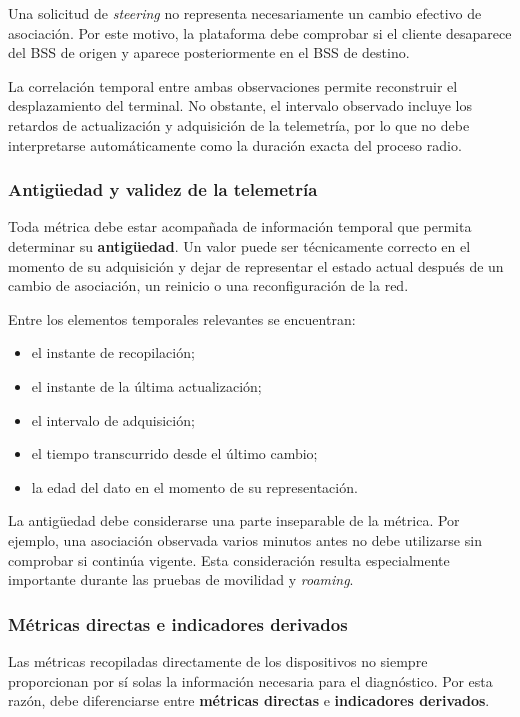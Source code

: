 Una solicitud de \textit{steering} no representa necesariamente un
cambio efectivo de asociación. Por este motivo, la plataforma debe
comprobar si el cliente desaparece del BSS de origen y aparece
posteriormente en el BSS de destino.

La correlación temporal entre ambas observaciones permite reconstruir el
desplazamiento del terminal. No obstante, el intervalo observado incluye
los retardos de actualización y adquisición de la telemetría, por lo que
no debe interpretarse automáticamente como la duración exacta del proceso
radio.

\subsubsection*{Antigüedad y validez de la telemetría}

Toda métrica debe estar acompañada de información temporal que permita
determinar su \textbf{antigüedad}. Un valor puede ser técnicamente
correcto en el momento de su adquisición y dejar de representar el estado
actual después de un cambio de asociación, un reinicio o una
reconfiguración de la red.

Entre los elementos temporales relevantes se encuentran:

\begin{itemize}
    \item el instante de recopilación;
    \item el instante de la última actualización;
    \item el intervalo de adquisición;
    \item el tiempo transcurrido desde el último cambio;
    \item la edad del dato en el momento de su representación.
\end{itemize}

La antigüedad debe considerarse una parte inseparable de la métrica. Por
ejemplo, una asociación observada varios minutos antes no debe utilizarse
sin comprobar si continúa vigente. Esta consideración resulta
especialmente importante durante las pruebas de movilidad y
\textit{roaming}.

\subsubsection*{Métricas directas e indicadores derivados}

Las métricas recopiladas directamente de los dispositivos no siempre
proporcionan por sí solas la información necesaria para el diagnóstico.
Por esta razón, debe diferenciarse entre
\textbf{métricas directas} e \textbf{indicadores derivados}.

